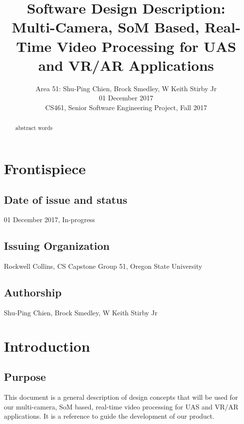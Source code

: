 \documentclass[letterpaper,10pt,serif,draftclsnofoot,onecolumn,compsoc,titlepage]{IEEEtran}
\title{Software Design Description: Multi-Camera, SoM Based, Real-Time Video Processing for UAS and VR/AR Applications}
\author{Area 51: Shu-Ping Chien, Brock Smedley, W Keith Stirby Jr \\ 01 December 2017 \\ CS461, Senior Software Engineering Project, Fall 2017}
\begin{document}
\begin{titlepage}
\maketitle
\begin{abstract}

abstract words \\

\thispagestyle{empty}
\end{abstract}
\end{titlepage}


\newpage

\section{Frontispiece}

\subsection{Date of issue and status}

01 December 2017, In-progress \\

\subsection{Issuing Organization}

Rockwell Collins, CS Capstone Group 51, Oregon State University \\

\subsection{Authorship}

Shu-Ping Chien, Brock Smedley, W Keith Stirby Jr \\

\section{Introduction}

\subsection{Purpose}

This document is a general description of design concepts that will be used for our 
multi-camera, SoM based, real-time video processing for UAS and VR/AR applications. 
It is a reference to guide the development of our product.  \\
\end{document}
